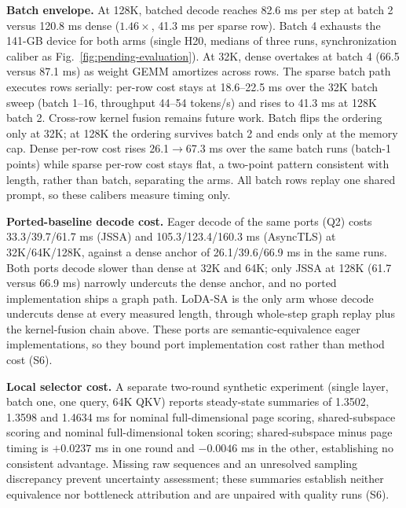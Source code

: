 \documentclass[conference,9pt,letterpaper]{IEEEtran}
\begin{document}
\textbf{Batch envelope.} At 128K, batched decode reaches 82.6 ms per step at batch 2 versus 120.8 ms dense ($1.46\times$, 41.3 ms per sparse row). Batch 4 exhausts the 141-GB device for both arms (single H20, medians of three runs, synchronization caliber as Fig.~\ref{fig:pending-evaluation}). At 32K, dense overtakes at batch 4 (66.5 versus 87.1 ms) as weight GEMM amortizes across rows. The sparse batch path executes rows serially: per-row cost stays at 18.6--22.5 ms over the 32K batch sweep (batch 1--16, throughput 44--54 tokens/s) and rises to 41.3 ms at 128K batch 2. Cross-row kernel fusion remains future work. Batch flips the ordering only at 32K; at 128K the ordering survives batch 2 and ends only at the memory cap. Dense per-row cost rises 26.1$\rightarrow$67.3 ms over the same batch runs (batch-1 points) while sparse per-row cost stays flat, a two-point pattern consistent with length, rather than batch, separating the arms. All batch rows replay one shared prompt, so these calibers measure timing only.

\textbf{Ported-baseline decode cost.} Eager decode of the same ports (Q2) costs 33.3/39.7/61.7 ms (JSSA) and 105.3/123.4/160.3 ms (AsyncTLS) at 32K/64K/128K, against a dense anchor of 26.1/39.6/66.9 ms in the same runs. Both ports decode slower than dense at 32K and 64K; only JSSA at 128K (61.7 versus 66.9 ms) narrowly undercuts the dense anchor, and no ported implementation ships a graph path. LoDA-SA is the only arm whose decode undercuts dense at every measured length, through whole-step graph replay plus the kernel-fusion chain above. These ports are semantic-equivalence eager implementations, so they bound port implementation cost rather than method cost (S6).

\textbf{Local selector cost.} A separate two-round synthetic experiment (single layer, batch one, one query, 64K QKV) reports steady-state summaries of 1.3502, 1.3598 and 1.4634 ms for nominal full-dimensional page scoring, shared-subspace scoring and nominal full-dimensional token scoring; shared-subspace minus page timing is $+0.0237$ ms in one round and $-0.0046$ ms in the other, establishing no consistent advantage. Missing raw sequences and an unresolved sampling discrepancy prevent uncertainty assessment; these summaries establish neither equivalence nor bottleneck attribution and are unpaired with quality runs (S6).
\end{document}
